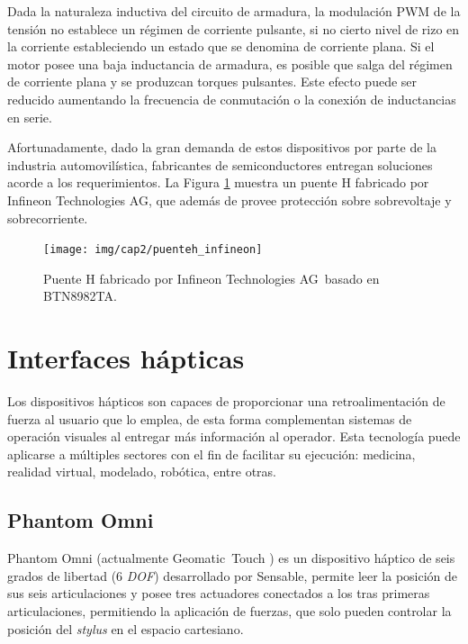 Dada la naturaleza inductiva del circuito de armadura, la modulación PWM de la tensión no establece un régimen de corriente pulsante, si no cierto nivel de rizo en la corriente estableciendo un estado que se denomina de corriente plana. Si el motor posee una baja inductancia de armadura, es posible que salga del régimen de corriente plana y se produzcan torques pulsantes. Este efecto puede ser reducido aumentando la frecuencia de conmutación o la conexión de inductancias en serie.

Afortunadamente, dado la gran demanda de estos dispositivos por parte de la industria automovilística, fabricantes de semiconductores entregan soluciones acorde a los requerimientos. La Figura \ref{cap2_punteh_infineon} muestra un puente H fabricado por Infineon Technologies AG\textregistered, que además de provee protección sobre sobrevoltaje y sobrecorriente.

\begin{figure}[ht]
  \centering
  \texttt{[image: img/cap2/puenteh\_infineon]}
  \caption{Puente H fabricado por Infineon Technologies AG\textregistered \, basado en BTN8982TA.}
  \label{cap2_punteh_infineon}
\end{figure}

\section{Interfaces hápticas}

Los dispositivos hápticos son capaces de proporcionar una retroalimentación de fuerza al usuario que lo emplea, de esta forma complementan sistemas de operación visuales al entregar más información al operador. Esta tecnología puede aplicarse a múltiples sectores con el fin de facilitar su ejecución: medicina, realidad virtual, modelado, robótica, entre otras.

\subsection{Phantom Omni \texttrademark}

Phantom Omni \texttrademark (actualmente Geomatic\textregistered \, Touch \texttrademark) es un dispositivo háptico de seis grados de libertad (6 \textit{DOF}) desarrollado por Sensable\textregistered, permite leer la posición de sus seis articulaciones y posee tres actuadores conectados a los tras primeras articulaciones, permitiendo la aplicación de fuerzas, que solo pueden controlar la posición del \textit{stylus} en el espacio cartesiano.

